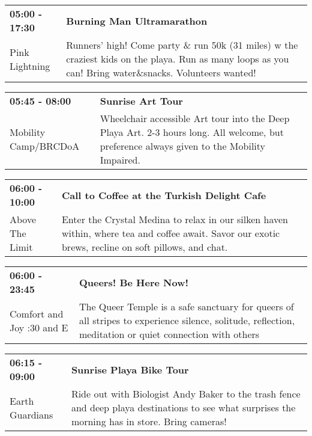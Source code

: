 \begin{tabular}{ p{1in} p{2.2in} }
    \textbf{05:00 - 17:30} & \textbf{Burning Man Ultramarathon} \\
    Pink Lightning \newline  & Runners' high! Come party \& run 50k (31 miles) w the craziest kids on the playa. Run as many loops as you can! Bring water\&snacks. Volunteers wanted! \\
    \hline 
\end{tabular}
    
\begin{tabular}{ p{1in} p{2.2in} }
    \textbf{05:45 - 08:00} & \textbf{Sunrise Art Tour} \\
    Mobility Camp/BRCDoA \newline  & Wheelchair accessible Art tour into the Deep Playa Art.
2-3 hours long. All welcome, but preference always given to the Mobility Impaired. \\
    \hline 
\end{tabular}
    
\begin{tabular}{ p{1in} p{2.2in} }
    \textbf{06:00 - 10:00} & \textbf{Call to Coffee at the Turkish Delight Cafe} \\
    Above The Limit \newline  & Enter the Crystal Medina to relax in our silken haven within, where tea and coffee await. Savor our exotic brews, recline on soft pillows, and chat. \\
    \hline 
\end{tabular}
    
\begin{tabular}{ p{1in} p{2.2in} }
    \textbf{06:00 - 23:45} & \textbf{Queers! Be Here Now!} \\
    Comfort and Joy \newline 7:30 and E & The Queer Temple is a safe sanctuary for queers of all stripes to experience silence, solitude, reflection, meditation or quiet connection with others \\
    \hline 
\end{tabular}
    
\begin{tabular}{ p{1in} p{2.2in} }
    \textbf{06:15 - 09:00} & \textbf{Sunrise Playa Bike Tour} \\
    Earth Guardians \newline  & Ride out with Biologist Andy Baker to the trash fence and deep playa destinations to see what surprises the morning has in store. Bring cameras! \\
    \hline 
\end{tabular}
    
